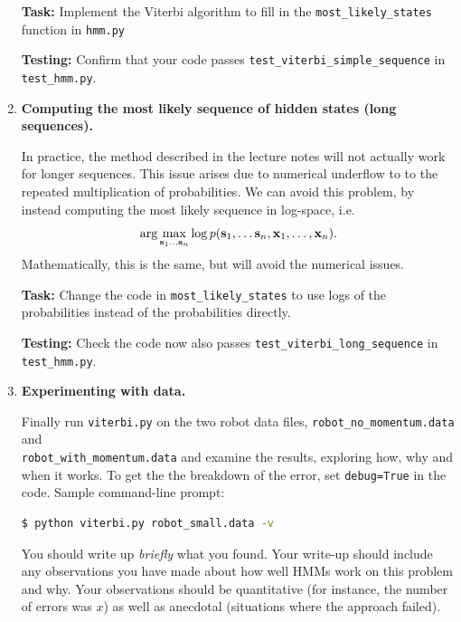 \documentclass[submit]{harvardml}
\begin{document}
\begin{enumerate}
  \textbf{Task:}  Implement the Viterbi algorithm to fill in the {\tt most\_likely\_states} function in
{\tt hmm.py}  

  \textbf{Testing:} 
  Confirm that your code 
  passes {\tt test\_viterbi\_simple\_sequence} in  {\tt test\_hmm.py}.

\item \textbf{Computing the most likely sequence of hidden states (long sequences).}
  
  In practice, the method described in the lecture notes will not
  actually work for longer sequences. This issue arises due to
  numerical underflow to to the repeated multiplication of
  probabilities. We can avoid this problem, by instead computing the
  most likely sequence in log-space, i.e.
  \[\arg\max_{\mathbf{s}_{1}\ldots \mathbf{s}_{n}}\log p(\mathbf{s}_1, \ldots
  \mathbf{s}_n, \mathbf{x}_1, \ldots, \mathbf{x}_n).\]
  Mathematically, this is the same, but will avoid the numerical
  issues.
 
 

 \textbf{Task:} Change the code in {\tt most\_likely\_states} to use logs of the probabilities
instead of the probabilities directly.  

\textbf{Testing:} Check the code now also passes {\tt test\_viterbi\_long\_sequence} in  {\tt test\_hmm.py}.

\item   \textbf{Experimenting with data.}

Finally run {\tt viterbi.py} on the two robot data files, {\tt robot\_no\_momentum.data} and \\{\tt robot\_with\_momentum.data} and examine the results,
  exploring how, why and when it works. To get the the breakdown of the error, set \texttt{debug=True} in the code. Sample command-line prompt: 
  \begin{lstlisting}[language=bash]
  $ python viterbi.py robot_small.data -v
\end{lstlisting}
  You should write up {\em
    briefly} what you found.
  Your write-up should include any observations you  have made
  about how well HMMs work on this problem and why.  Your observations
  should be quantitative (for instance, the number of errors was $x$) as well
  as anecdotal (situations where the approach failed).                                                                                                                                                                     
                                                                                                                                                                                 

\end{enumerate}
\end{document}
